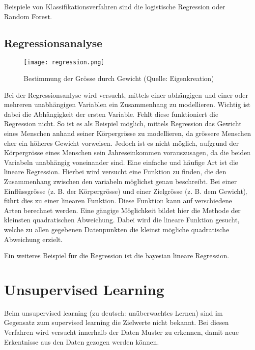 Beispiele von Klassifikationsverfahren sind die logistische Regression oder Random Forest.

\subsection{Regressionsanalyse}
\begin{figure}[h!]
	\centering
	\texttt{[image: regression.png]}
	\caption{Bestimmung der Grösse durch Gewicht (Quelle: Eigenkreation)}
\end{figure}
Bei der Regressionsanlyse wird versucht, mittels einer abhängigen und einer oder mehreren unabhängigen Variablen ein Zusammenhang zu modellieren. Wichtig ist dabei die Abhängigkeit der ersten Variable. Fehlt diese funktioniert die Regression nicht. So ist es als Beispiel möglich, mittels Regression das Gewicht eines Menschen anhand seiner Körpergrösse zu modellieren, da grössere Menschen eher ein höheres Gewicht vorweisen. Jedoch ist es nicht möglich, aufgrund der Körpergrösse eines Menschen sein Jahreseinkommen vorauszusagen, da die beiden Variabeln unabhängig voneinander sind.
Eine einfache und häufige Art ist die lineare Regression. Hierbei wird versucht eine Funktion zu finden, die den Zusammenhang zwischen den variabeln möglichst genau beschreibt. Bei einer Einflüssgrösse (z. B. der Körpergrösse) und einer Zielgrösse (z. B. dem Gewicht), führt dies zu einer linearen Funktion.
Diese Funktion kann auf verschiedene Arten berechnet werden. Eine gängige Möglichkeit bildet hier die Methode der kleinsten quadratischen Abweichung. Dabei wird die lineare Funktion gesucht, welche zu allen gegebenen Datenpunkten die kleinst mögliche quadratische Abweichung erzielt.

Ein weiteres Beispiel für die Regression ist die bayesian lineare Regression.

\section{Unsupervised Learning}
Beim unsupervised learning (zu deutsch: unüberwachtes Lernen) sind im Gegensatz zum supervised learning die Zielwerte nicht bekannt. Bei diesen Verfahren wird versucht innerhalb der Daten Muster zu erkennen, damit neue Erkentnisse aus den Daten gezogen werden können.


